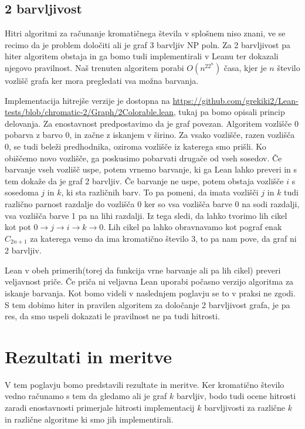 \documentclass[mat1]{fmfdelo}
\begin{document}
\subsection{2 barvljivost}
Hitri algoritmi za računanje kromatičnega števila v splošnem niso znani, 
ve se recimo da je problem določiti ali je graf 3 barvljiv NP poln.
Za 2 barvljivost pa hiter algoritem obstaja in ga bomo tudi implementirali v Leanu ter dokazali njegovo pravilnost. 
Naš trenuten algoritem porabi $O(n^22^n)$ časa, kjer je $n$ število vozlišč grafa ker mora pregledati vsa možna barvanja.

Implementacija hitrejše verzije je dostopna na \url{https://github.com/grekiki2/Lean-tests/blob/chromatic-2/Graph/2Colorable.lean}, tukaj pa
bomo opisali princip delovanja. 
Za enostavnost predpostavimo da je graf povezan.
Algoritem vozlišče $0$ pobarva z barvo $0$, in začne z iskanjem v širino. Za vsako vozlišče, razen vozlišča 0, se tudi beleži
predhodnika, oziroma vozlišče iz katerega smo prišli. Ko obiščemo novo vozlišče, ga poskusimo pobarvati drugače od vseh sosedov.
Če barvanje vseh vozlišč uspe, potem vrnemo barvanje, ki ga Lean lahko preveri in s tem dokaže da je graf 2 barvljiv.
Če barvanje ne uspe, potem obstaja vozlišče $i$ s sosedoma $j$ in $k$, ki sta različnih barv. To pa pomeni, da imata vozlišči $j$ in $k$
tudi različno parnost razdalje do vozlišča $0$ ker so vsa vozlišča barve 0 na sodi razdalji, vsa vozlišča barve 1 pa na lihi razdalji.
Iz tega sledi, da lahko tvorimo lih cikel kot pot $0\to j\to i\to k\to 0$. Lih cikel pa lahko obravnavamo kot pograf enak $C_{2n+1}$ za katerega
vemo da ima kromatično število $3$, to pa nam pove, da graf ni 2 barvljiv.

Lean v obeh primerih(torej da funkcija vrne barvanje ali pa lih cikel) preveri veljavnost priče. Če priča ni veljavna
Lean uporabi počasno verzijo algoritma za iskanje barvanja. Kot bomo videli v naslednjem poglavju se to v praksi ne zgodi. 
S tem dobimo hiter in pravilen algoritem za določanje 2 barvljivost grafa, je pa res, da smo uspeli dokazati le pravilnost
ne pa tudi hitrosti.


\section{Rezultati in meritve}
V tem poglavju bomo predstavili rezultate in meritve.
Ker kromatično število vedno računamo s tem da gledamo ali je graf $k$ barvljiv, bodo tudi ocene hitrosti zaradi enostavnosti
primerjale hitrosti implementacij $k$ barvljivosti za različne $k$ in različne algoritme ki smo jih implementirali. 
\end{document}
